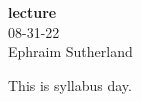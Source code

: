 



\begin{center}
{\large \bf lecture }   \\ \large 08-31-22 \\ Ephraim Sutherland
\end{center}

This is syllabus day.






